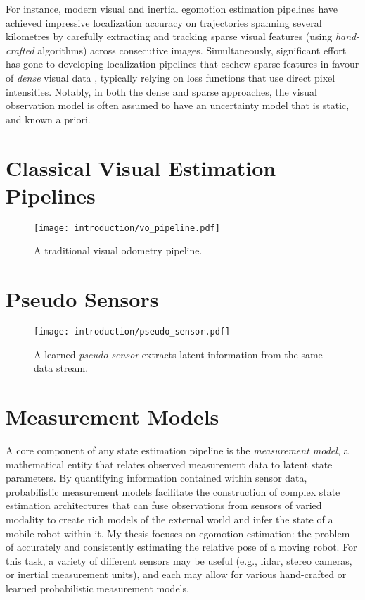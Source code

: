 For instance, modern visual and inertial egomotion estimation pipelines \citep{Leutenegger2015-fk, Cvisic2015-mt, Tsotsos2015-qs} have achieved impressive localization accuracy on trajectories spanning several kilometres by carefully extracting and tracking sparse visual features (using \textit{hand-crafted} algorithms) across consecutive images. Simultaneously, significant effort has gone to developing localization pipelines that eschew sparse features in favour of  \textit{dense} visual data \citep{Alcantarilla2016-kv, Forster2014-bm},  typically relying on loss functions that use direct pixel intensities. Notably, in both the dense and sparse approaches, the visual observation model is often assumed to have an uncertainty model that is static, and known a priori.
\section{Classical Visual Estimation Pipelines}

\begin{figure}
\begin{center}
		\texttt{[image: introduction/vo\_pipeline.pdf]}
		\caption{A traditional visual odometry pipeline.}
  	\label{fig:intro_vo_pipeline}
\end{center}
\end{figure}

\section{Pseudo Sensors}

\begin{figure}
\begin{center}
		\texttt{[image: introduction/pseudo\_sensor.pdf]}
		\caption{A learned \textit{pseudo-sensor} extracts latent information from the same data stream.}
  	\label{fig:intro_pseudo_sensor}
\end{center}
\end{figure}


\section{Measurement Models}
A core component of any state estimation pipeline is the \textit{measurement model}, a mathematical entity that relates  observed measurement data to latent state parameters. By quantifying information contained within sensor data, probabilistic measurement models facilitate the construction of complex state estimation architectures that can fuse observations from sensors of varied modality to create rich models of the external world and infer the state of a mobile robot within it. My thesis focuses on egomotion estimation: the problem of accurately and consistently estimating the relative pose of a moving robot. For this task, a variety of different sensors may be useful (e.g., lidar, stereo cameras, or inertial measurement units), and each may allow for various hand-crafted or learned probabilistic measurement models.

